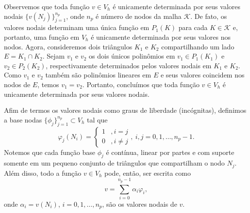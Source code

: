 Observemos que toda função $v\in V_h$ é unicamente determinada por seus valores nodais $\{v(N_j)\}_{j=1}^{n_p}$, onde $n_p$ é número de nodos da malha $\mathcal{K}$. De fato, os valores nodais determinam uma única função em $P_1(K)$ para cada $K\in\mathcal{K}$ e, portanto, uma função em $V_h$ é unicamente determinada por seus valores nos nodos. Agora, consideremos dois triângulos $K_1$ e $K_2$ compartilhando um lado $E = K_1\cap K_2$. Sejam $v_1$ e $v_2$ os dois únicos polinômios em $v_1\in P_1(K_1)$ e $v_2\in P_2(K_2)$, respectivamente determinados pelos valores nodais em $K_1$ e $K_2$. Como $v_1$ e $v_2$ também são polinômios lineares em $E$ e seus valores coincidem nos nodos de $E$, temos $v_1 = v_2$. Portanto, concluímos que toda função $v\in V_h$ é unicamente determinada por seus valores nodais.

Afim de termos os valores nodais como graus de liberdade (incógnitas), definimos a base nodas $\{\phi_j\}_{j=1}^{n_p}\subset V_h$ tal que
\begin{equation}
  \varphi_j(N_i) = \left\{
    \begin{array}{ll}
      1 &, i=j\\
      0 &, i\neq j
    \end{array}
\right.,~i,j=0, 1, \dotsc, n_p-1.
\end{equation}
Notemos que cada função base $\phi_j$ é contínua, linear por partes e com suporte somente em um pequeno conjunto de triângulos que compartilham o nodo $N_j$. Além disso, todo a função $v\in V_h$ pode, então, ser escrita como
\begin{equation}
  v = \sum_{i=0}^{n_p-1}\alpha_i\varphi_i,
\end{equation}
onde $\alpha_i = v(N_i)$, $i=0, 1, \ldots, n_p$, são os valores nodais de $v$.

